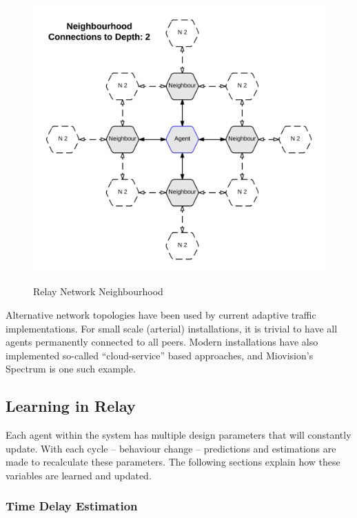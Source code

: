 \documentclass{report}
\begin{document}
\begin{figure}[!htpb]
	\caption{Relay Network Neighbourhood}
	\includegraphics[width=\textwidth]{figures/Relay_Network.png}
	\label{fig:Relay_Network}
\end{figure}

Alternative network topologies have been used by current adaptive traffic implementations.
For small scale (arterial) installations, it is trivial to have all agents permanently connected to all peers.
Modern installations have also implemented so-called ``cloud-service'' based approaches, and Miovision's Spectrum is one such example.\\


\subsection{Learning in Relay}
\label{sec:learning_in_relay}

Each agent within the system has multiple design parameters that will constantly update. With each cycle -- behaviour change -- predictions and estimations are made to recalculate these parameters. 
The following sections explain how these variables are learned and updated.

\subsubsection{Time Delay Estimation}
\end{document}
